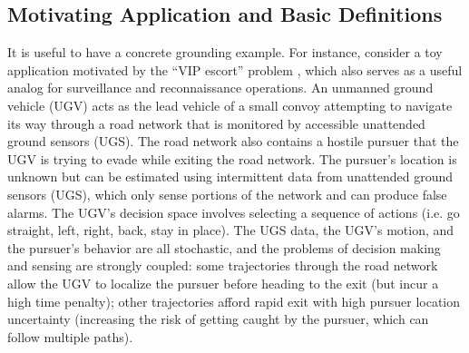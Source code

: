 
\subsection{Motivating Application and Basic Definitions} \label{sec:mot_example}
    It is useful to have a concrete grounding example. For instance, consider a toy application motivated by the ``VIP escort'' problem \cite{Humphrey2012-lr}, which also serves as a useful analog for surveillance and reconnaissance operations.  An unmanned ground vehicle (UGV) acts as the lead vehicle of a small convoy attempting to navigate its way through a road network that is monitored by accessible unattended ground sensors (UGS). The road network also contains a hostile pursuer that the UGV is trying to evade while exiting the road network. The pursuer's location is unknown but can be estimated using intermittent data from unattended ground sensors (UGS), which only sense portions of the network and can produce false alarms. The UGV's decision space involves selecting a sequence of actions (i.e. go straight, left, right, back, stay in place). The UGS data, the UGV's motion, and the pursuer's behavior are all stochastic, and the problems of decision making and sensing are strongly coupled: some trajectories through the road network allow the UGV to localize the pursuer before heading to the exit (but incur a high time penalty); other trajectories afford rapid exit with high pursuer location uncertainty (increasing the risk of getting caught by the pursuer, which can follow multiple paths). 


